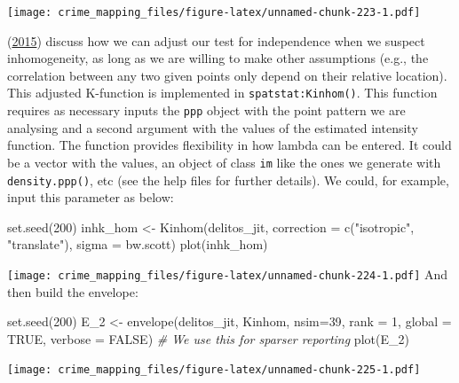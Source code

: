 \documentclass[
  krantz2]{krantz}
\makeatletter
\newenvironment{Shaded}{\begin{snugshade}}{\end{snugshade}}
\newcommand{\AttributeTok}[1]{\textcolor[rgb]{0.61,0.61,0.61}{#1}}
\newcommand{\CommentTok}[1]{\textcolor[rgb]{0.37,0.37,0.37}{\textit{#1}}}
\newcommand{\ConstantTok}[1]{\textcolor[rgb]{0,0,0}{#1}}
\newcommand{\DecValTok}[1]{\textcolor[rgb]{0.06,0.06,0.06}{#1}}
\newcommand{\FunctionTok}[1]{\textcolor[rgb]{0,0,0}{#1}}
\newcommand{\NormalTok}[1]{#1}
\newcommand{\OtherTok}[1]{\textcolor[rgb]{0.37,0.37,0.37}{#1}}
\newcommand{\StringTok}[1]{\textcolor[rgb]{0.5,0.5,0.5}{#1}}
\newenvironment{kframe}{%
\medskip{}
\setlength{\fboxsep}{.8em}
 \def\at@end@of@kframe{}%
 \ifinner\ifhmode%
  \def\at@end@of@kframe{\end{minipage}}%
  \begin{minipage}{\columnwidth}%
 \fi\fi%
 \def\FrameCommand##1{\hskip\@totalleftmargin \hskip-\fboxsep
 \colorbox{shadecolor}{##1}\hskip-\fboxsep
     \hskip-\linewidth \hskip-\@totalleftmargin \hskip\columnwidth}%
 \MakeFramed {\advance\hsize-\width
   \@totalleftmargin\z@ \linewidth\hsize
   \@setminipage}}%
 {\par\unskip\endMakeFramed%
 \at@end@of@kframe}
\renewenvironment{Shaded}{\begin{kframe}}{\end{kframe}}
\makeatother
\begin{document}
\texttt{[image: crime\_mapping\_files/figure-latex/unnamed-chunk-223-1.pdf]}

(\protect\hyperlink{ref-Baddeley_2016}{2015}) discuss how we can adjust our test for independence when we suspect inhomogeneity, as long as we are willing to make other assumptions (e.g., the correlation between any two given points only depend on their relative location). This adjusted K-function is implemented in \texttt{spatstat:Kinhom()}. This function requires as necessary inputs the \texttt{ppp} object with the point pattern we are analysing and a second argument with the values of the estimated intensity function. The function provides flexibility in how lambda can be entered. It could be a vector with the values, an object of class \texttt{im} like the ones we generate with \texttt{density.ppp()}, etc (see the help files for further details). We could, for example, input this parameter as below:

\begin{Shaded}
\begin{Highlighting}[]
\FunctionTok{set.seed}\NormalTok{(}\DecValTok{200}\NormalTok{)}
\NormalTok{inhk\_hom }\OtherTok{\textless{}{-}} \FunctionTok{Kinhom}\NormalTok{(delitos\_jit,}
                   \AttributeTok{correction =} \FunctionTok{c}\NormalTok{(}\StringTok{"isotropic"}\NormalTok{, }\StringTok{"translate"}\NormalTok{),}
                   \AttributeTok{sigma =}\NormalTok{ bw.scott)}
\FunctionTok{plot}\NormalTok{(inhk\_hom)}
\end{Highlighting}
\end{Shaded}

\texttt{[image: crime\_mapping\_files/figure-latex/unnamed-chunk-224-1.pdf]}
And then build the envelope:

\begin{Shaded}
\begin{Highlighting}[]
\FunctionTok{set.seed}\NormalTok{(}\DecValTok{200}\NormalTok{)}
\NormalTok{E\_2 }\OtherTok{\textless{}{-}} \FunctionTok{envelope}\NormalTok{(delitos\_jit, Kinhom, }\AttributeTok{nsim=}\DecValTok{39}\NormalTok{, }\AttributeTok{rank =} \DecValTok{1}\NormalTok{, }\AttributeTok{global =} \ConstantTok{TRUE}\NormalTok{,}
              \AttributeTok{verbose =} \ConstantTok{FALSE}\NormalTok{) }\CommentTok{\# We use this for sparser reporting}
\FunctionTok{plot}\NormalTok{(E\_2)}
\end{Highlighting}
\end{Shaded}

\texttt{[image: crime\_mapping\_files/figure-latex/unnamed-chunk-225-1.pdf]}
\end{document}
